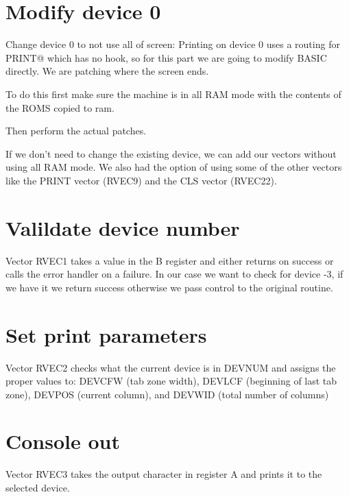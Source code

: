 \documentclass{article}
\begin{document}
\section{Modify device 0}
Change device 0 to not use all of screen: Printing on device 0 uses a
routing for PRINT@ which has no hook, so for this part we are going to
modify BASIC directly. We are patching where the screen ends.

To do this first make sure the machine is in all RAM mode with the
contents of the ROMS copied to ram.



Then perform the actual patches.



If we don't need to change the existing device, we can add our vectors
without using all RAM mode. We also had the option of using some of
the other vectors like the PRINT vector (RVEC9) and the CLS vector
(RVEC22).

\section{Valildate device number}
Vector RVEC1 takes a value in the B register and either returns on
success or calls the error handler on a failure. In our case we want
to check for device -3, if we have it we return success otherwise we
pass control to the original routine.



\section{Set print parameters}
Vector RVEC2 checks what the current device is in DEVNUM and assigns
the proper values to: DEVCFW (tab zone width), DEVLCF (beginning of
last tab zone), DEVPOS (current column), and DEVWID (total number of
columns)



\section{Console out}
Vector RVEC3 takes the output character in register A and prints it to
the selected device.


\end{document}
